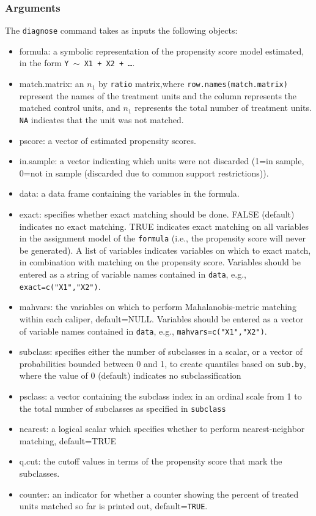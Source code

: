 \documentclass[oneside,letterpaper,titlepage]{article}
\begin{document}
\begin{appendix}
\subsubsection{Arguments}
The \texttt{diagnose} command takes as inputs the following
objects:
\begin{itemize}
\item{formula}:  a symbolic representation of the propensity score model estimated, in the form {\tt Y $\sim$ X1 + X2 + \dots}.
\item{match.matrix}: an $n_1$ by \texttt{ratio} matrix,where
  \texttt{row.names(match.matrix)} represent the names of the
  treatment units and the column represents the matched control units, and $n_1$
  represents the total number of treatment units.  \texttt{NA}
  indicates that the unit was not matched. 
\item{pscore}: a vector of estimated propensity scores.  
\item{in.sample}:  a vector indicating which units were not discarded (1=in sample, 0=not in sample (discarded due to common support restrictions)).
\item{data}: a data frame containing the variables in the formula.
\item{exact}: specifies whether exact matching should be done.  FALSE (default) indicates no exact 
  matching.  TRUE indicates exact matching on all variables in the 
  assignment model of the \texttt{formula} (i.e., the propensity score
  will never be generated).  A list of variables indicates variables on
  which to exact match, in combination with matching on the propensity
  score.  Variables should be entered as a  string
  of variable names contained in \texttt{data}, e.g.,  \texttt{exact=c("X1","X2")}.
\item{mahvars}: the variables on which to perform Mahalanobis-metric matching
    within each caliper, default=NULL.  Variables should be entered as
    a vector of variable names contained in \texttt{data}, e.g., \texttt{mahvars=c("X1","X2")}.
\item{subclass}: specifies either the number of
  subclasses in a scalar, or a vector of probabilities bounded
  between 0 and 1, to create quantiles based on \texttt{sub.by}, where the value of
  0 (default) indicates no subclassification
\item{psclass}: a vector containing the subclass index in an ordinal scale
  from 1 to the total number of subclasses as specified in
  \texttt{subclass} 
\item{nearest}: a logical scalar which specifies whether
  to perform nearest-neighbor matching, default=TRUE 
\item{q.cut}: the cutoff values in terms of the propensity score that
  mark the subclasses.
\item{counter}: an indicator for whether a counter showing the percent of treated units matched so far is printed out, default={\tt TRUE}.
\end{itemize}


\end{appendix}
\end{document}
